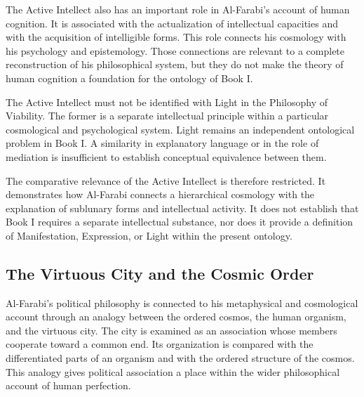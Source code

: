The Active Intellect also has
an important role in Al-Farabi's
account of human cognition.
It is associated with the
actualization of intellectual
capacities and with the
acquisition of intelligible
forms. This role connects
his cosmology with his
psychology and epistemology.
Those connections are relevant
to a complete reconstruction
of his philosophical system,
but they do not make the
theory of human cognition
a foundation for the ontology
of Book I.
\citep[secs.~2.1--2.2]{GermannAlFarabiSocietyReligionSEP2021}

\label{para:VS.B01.P01.C08.S12.SS10.P003}

The Active Intellect must not
be identified with Light in
the Philosophy of Viability.
The former is a separate
intellectual principle within
a particular cosmological
and psychological system.
Light remains an independent
ontological problem in Book I.
A similarity in explanatory
language or in the role of
mediation is insufficient
to establish conceptual
equivalence between them.

\label{para:VS.B01.P01.C08.S12.SS10.P004}

The comparative relevance of
the Active Intellect is therefore
restricted. It demonstrates
how Al-Farabi connects a
hierarchical cosmology with
the explanation of sublunary
forms and intellectual activity.
It does not establish that
Book I requires a separate
intellectual substance, nor
does it provide a definition
of Manifestation, Expression,
or Light within the present
ontology.



\subsection{The Virtuous City and the Cosmic Order}
\label{subsec:ch08-farabi-virtuous-city}

\label{para:VS.B01.P01.C08.S12.SS11.P001}

Al-Farabi's political philosophy
is connected to his metaphysical
and cosmological account through
an analogy between the ordered
cosmos, the human organism,
and the virtuous city. The city
is examined as an association
whose members cooperate toward
a common end. Its organization
is compared with the differentiated
parts of an organism and with
the ordered structure of the
cosmos. This analogy gives
political association a place
within the wider philosophical
account of human perfection.
\citep[pp.~229--233]{AlFarabiVirtuousCity}

